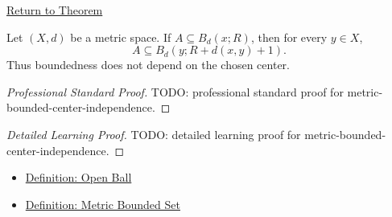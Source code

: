 \newpage
{}
\label{prf:metric-bounded-center-independence}

\begin{remark*}[Return]
\hyperref[thm:metric-bounded-center-independence]{Return to Theorem}
\end{remark*}

\begin{theorem*}
Let \((X,d)\) be a metric space.  If \(A\subseteq B_d(x;R)\), then for every
\(y\in X\),
\[
  A\subseteq B_d(y;R+d(x,y)+1).
\]
Thus boundedness does not depend on the chosen center.
\end{theorem*}

\begin{proof}[Professional Standard Proof]
\LRAProofBodyStart
TODO: professional standard proof for metric-bounded-center-independence.
\end{proof}

\begin{proof}[Detailed Learning Proof]
\LRAProofBodyStart
TODO: detailed learning proof for metric-bounded-center-independence.
\end{proof}

\begin{remark*}
\end{remark*}

\begin{dependencies}
\begin{itemize}
  \item \hyperref[def:metric-open-ball]{Definition: Open Ball}
  \item \hyperref[def:metric-bounded-set]{Definition: Metric Bounded Set}
\end{itemize}
\end{dependencies}

\clearpage
